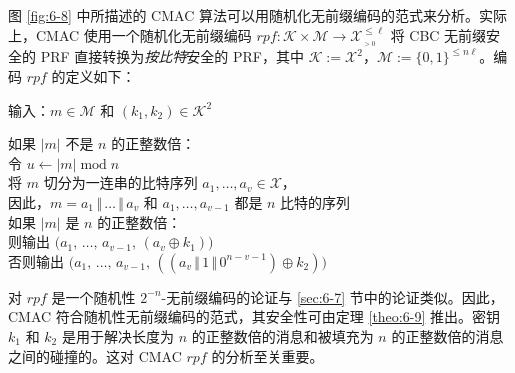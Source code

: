 \begin{snote}[安全性。]
图 \ref{fig:6-8} 中所描述的 CMAC 算法可以用随机化无前缀编码的范式来分析。实际上，CMAC 使用一个随机化无前缀编码 $rpf:\mathcal{K}\times\mathcal{M}\to\mathcal{X}^{\leq\ell}_{_{>0}}$ 将 CBC 无前缀安全的 PRF 直接转换为\emph{按比特}安全的 PRF，其中 $\mathcal{K}:=\mathcal{X}^2$，$\mathcal{M}:=\{0,1\}^{\leq n\ell}$。编码 $rpf$ 的定义如下：

\vspace{5pt}

\hspace*{5pt} 输入：$m\in\mathcal{M}$ 和 $(k_1,k_2)\in\mathcal{K}^2$

\vspace{3pt}

\hspace*{5pt} 如果 $|m|$ 不是 $n$ 的正整数倍：\\
\hspace*{50pt} 令 $u\leftarrow |m|\;\mathrm{mod}\;n$\\
\hspace*{26pt} 将 $m$ 切分为一连串的比特序列 $a_1,\dots,a_v\in\mathcal{X}$，\\
\hspace*{50pt} 因此，$m=a_1\,\Vert\,\dots\,\Vert\,a_v$ 和 $a_1,\dots,a_{v-1}$ 都是 $n$ 比特的序列\\
\hspace*{26pt} 如果 $|m|$ 是 $n$ 的正整数倍：\\
\hspace*{50pt} 则输出 $\big(a_1,\,\dots,\,a_{v-1},\,(a_v\oplus k_1)\big)$\\
\hspace*{50pt} 否则输出 $\big(a_1,\,\dots,\,a_{v-1},\,((a_v\,\Vert\,1\,\Vert\,0^{n-v-1})\oplus k_2)\big)$

\vspace{5pt}

\noindent
对 $rpf$ 是一个随机性 $2^{-n}$-无前缀编码的论证与 \ref{sec:6-7} 节中的论证类似。因此，CMAC 符合随机性无前缀编码的范式，其安全性可由定理 \ref{theo:6-9} 推出。密钥 $k_1$ 和 $k_2$ 是用于解决长度为 $n$ 的正整数倍的消息和被填充为 $n$ 的正整数倍的消息之间的碰撞的。这对 CMAC $rpf$ 的分析至关重要。
\end{snote}

